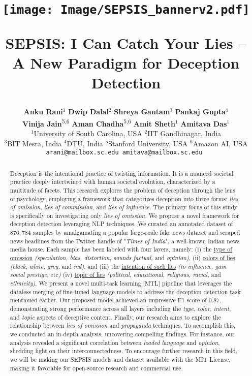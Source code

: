 \documentclass[11pt]{article}
\title{
\vspace{-20mm}
\begin{center}
\texttt{[image: Image/SEPSIS\_bannerv2.pdf]}
\end{center}
SEPSIS: I Can Catch Your Lies -- A New Paradigm for Deception Detection
}
\author{\textbf{Anku Rani}$^{1}$ \quad \textbf{Dwip Dalal}$^{2}$ \quad \textbf{Shreya Gautam}$^{3}$ \quad \textbf{Pankaj Gupta}$^{4}$ \\
\textbf{Vinija Jain}\dag\textsuperscript{5,6} \quad
\textbf{Aman Chadha}\dag\textsuperscript{5,6} \quad \textbf{Amit Sheth}$^{1}$ \quad \textbf{Amitava Das}$^{1}$ \quad \\
$^{1}$University of South Carolina, USA \quad     
$^{2}$IIT Gandhinagar, India \quad \\
$^{3}$BIT Mesra, India \quad
$^{4}$DTU, India \quad 
$^{5}$Stanford University, USA \quad  
$^{6}$Amazon AI, USA \\
\tt  arani@mailbox.sc.edu \quad
\tt amitava@mailbox.sc.edu
}
\begin{document}
\maketitle
\renewcommand{\thefootnote}{\fnsymbol{footnote}}
\renewcommand*{\thefootnote}{\arabic{footnote}}
\setcounter{footnote}{0}
\begin{abstract}

Deception is the intentional practice of twisting information. It is a nuanced societal practice deeply intertwined with human societal evolution, characterized by a multitude of facets. This research explores the problem of deception through the lens of psychology, employing a framework that categorizes deception into three forms: \emph{lies of omission}, \emph{lies of commission}, and \emph{lies of influence.} The primary focus of this study is specifically on investigating only \emph{lies of omission.} We propose a novel framework for deception detection leveraging NLP techniques. We curated an annotated dataset of $876,784$ samples by amalgamating a popular large-scale fake news dataset and scraped news headlines from the Twitter handle of "\emph{Times of India}", a well-known Indian news media house. Each sample has been labeled with four layers, namely: (i) the \ul{type of omission} \textit{(speculation, bias, distortion, sounds factual,} and \textit{opinion)}, (ii) \ul{colors of lies} \textit{(black, white, grey,} and \textit{red)}, and (iii) the \ul{intention of such lies} \textit{(to influence, gain social prestige,} etc\textit{)} (iv) \ul{topic of lies} \textit{(political, educational, religious, racial,} and \textit{ethnicity)}. We present a novel multi-task learning [MTL] pipeline that leverages the dataless merging of fine-tuned language models to address the deception detection task mentioned earlier. Our proposed model achieved an impressive F1 score of 0.87, demonstrating strong performance across all layers including the \textit{type}, \textit{color}, \textit{intent}, and \textit{topic} aspects of deceptive content.
Finally, our research aims to explore the relationship between \emph{lies of omission} and \emph{propaganda} techniques. To accomplish this, we conducted an in-depth analysis, uncovering compelling findings. For instance, our analysis revealed a significant correlation between \emph{loaded language} and \emph{opinion}, shedding light on their interconnectedness. 
To encourage further research in this field, we will be making our SEPSIS models and dataset available with the MIT License, making it favorable for open-source research and commercial use.

\end{abstract}













%



\end{document}
